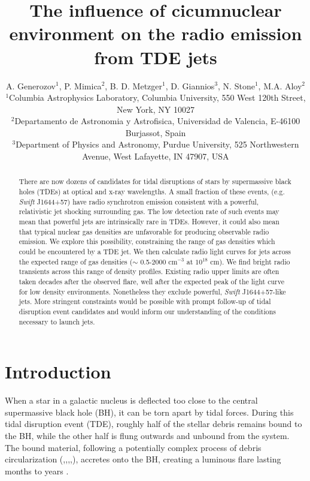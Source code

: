 \documentclass[usenatbib,fleqn]{mnras}
\title[Influence of CNM on TDE radio emission]{The influence of
  cicumnuclear environment on the radio emission from TDE jets}
\author[Generozov et al.]{ A. Generozov$^{1}$, P. Mimica$^{2}$,
  B. D. Metzger$^{1}$, D. Giannios$^{3}$, N. Stone$^{1}$,
  M.A. Aloy$^{2}$
  \\
  $^{1}$Columbia Astrophysics Laboratory, Columbia University, 550 West 120th Street, New York, NY 10027\\
  $^{2}$Departamento de Astronomia y Astrofisica, Universidad de Valencia, E-46100 Burjassot, Spain\\
  $^{3}$Department of Physics and Astronomy, Purdue University, 525
  Northwestern Avenue, West Lafayette, IN 47907, USA}
\begin{document}
\maketitle
\begin{abstract}
  There are now dozens of candidates for tidal disruptions of stars by
  supermassive black holes (TDEs) at optical and x-ray wavelengths. A
  small fraction of these events, (e.g. {\it Swift} J1644+57) have
  radio synchrotron emission consistent with a powerful, relativistic
  jet shocking surrounding gas. The low detection rate of such events
  may mean that powerful jets are intrinsically rare in TDEs. However,
  it could also mean that typical nuclear gas densities are
  unfavorable for producing observable radio emission. We explore this
  possibility, constraining the range of gas densities which could be
  encountered by a TDE jet. We then calculate radio light curves for
  jets across the expected range of gas densities ($\sim$ 0.5-2000
  cm$^{-3}$ at $10^{18}$ cm). We find bright radio transients across
  this range of density profiles. Existing radio upper limits are
  often taken decades after the observed flare, well after the
  expected peak of the light curve for low density
  environments. Nonetheless they exclude powerful, {\it Swift}
  J1644+57-like jets. More stringent constraints would be possible
  with prompt follow-up of tidal disruption event candidates and would
  inform our understanding of the conditions necessary to launch jets.
\end{abstract}
\section{Introduction}
\label{sec:intro}
When a star in a galactic nucleus is deflected too close to the
central supermassive black hole (BH), it can be torn apart by tidal
forces.  During this tidal disruption event (TDE), roughly half of the
stellar debris remains bound to the BH, while the other half is flung
outwards and unbound from the system.  The bound material, following a
potentially complex process of debris circularization
(\citealt{Guillochon+2013},\citealt{Hayasaki+2013},\citealt{Hayasaki+2015},\citealt{Shiokawa+2015},\citealt{Bonnerot+2015}),
accretes onto the BH, creating a luminous flare lasting months to
years \citep{Hills1975, Carter+1982, Rees1988}.
\end{document}
